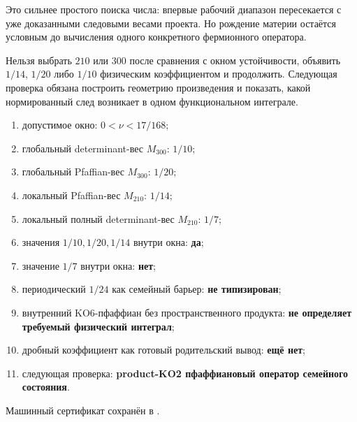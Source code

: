 Это сильнее простого поиска числа: впервые рабочий диапазон пересекается с
уже доказанными следовыми весами проекта. Но рождение материи остаётся
условным до вычисления одного конкретного фермионного оператора.

\begin{nogocriterion}
Нельзя выбрать $210$ или $300$ после сравнения с окном устойчивости,
объявить $1/14$, $1/20$ либо $1/10$ физическим коэффициентом и продолжить.
Следующая проверка обязана построить геометрию произведения и показать, какой
нормированный след возникает в одном функциональном интеграле.
\end{nogocriterion}

\begin{protocol}
\begin{enumerate}
 \item допустимое окно: \textbf{$0<\nu<17/168$};
 \item глобальный determinant-вес $M_{300}$: \textbf{$1/10$};
 \item глобальный Pfaffian-вес $M_{300}$: \textbf{$1/20$};
 \item локальный Pfaffian-вес $M_{210}$: \textbf{$1/14$};
 \item локальный полный determinant-вес $M_{210}$: \textbf{$1/7$};
 \item значения $1/10,1/20,1/14$ внутри окна: \textbf{да};
 \item значение $1/7$ внутри окна: \textbf{нет};
 \item периодический $1/24$ как семейный барьер: \textbf{не типизирован};
 \item внутренний KO6-пфаффиан без пространственного продукта:
 \textbf{не определяет требуемый физический интеграл};
 \item дробный коэффициент как готовый родительский вывод:
 \textbf{ещё нет};
 \item следующая проверка:
 \textbf{product-KO2 пфаффиановый оператор семейного состояния}.
\end{enumerate}
\end{protocol}

Машинный сертификат сохранён в
.